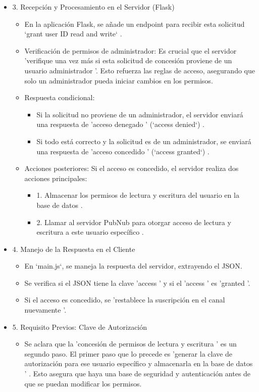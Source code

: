 \documentclass{report}
\begin{document}
\begin{itemize}
    \item 3. Recepción y Procesamiento en el Servidor (Flask)
    \begin{itemize}
        \item En la aplicación Flask, se añade un  endpoint para recibir esta solicitud `grant user ID read and write` .
        \item Verificación de permisos de administrador:  Es crucial que el servidor  'verifique una vez más si esta solicitud de concesión proviene de 
        un usuario administrador '. Esto refuerza las reglas de acceso, asegurando que solo un administrador pueda iniciar cambios en los permisos.
        \item Respuesta condicional: 
        \begin{itemize}
            \item Si la solicitud no proviene de un administrador, el servidor enviará una respuesta de   'acceso denegado ' (`access denied`) .
            \item Si todo está correcto y la solicitud es de un administrador, se enviará una respuesta de   'acceso concedido ' (`access granted`) .
        \end{itemize}
        \item Acciones posteriores:  Si el acceso es concedido, el servidor realiza dos acciones principales:
        \begin{itemize}
            \item 1.   Almacenar los permisos de lectura y escritura del usuario en la base de datos .
            \item 2.   Llamar al servidor PubNub para otorgar acceso de lectura y escritura a este usuario específico .    
        \end{itemize}
    \end{itemize}

    \item 4. Manejo de la Respuesta en el Cliente
    \begin{itemize}
        \item En `main.js`, se maneja la respuesta del servidor, extrayendo el JSON.
        \item Se verifica si el JSON tiene la clave  'access ' y si el  'access ' es  'granted '.
        \item Si el acceso es concedido, se  'restablece la suscripción en el canal nuevamente '.    
    \end{itemize}

    \item 5. Requisito Previos: Clave de Autorización
    \begin{itemize}
        \item Se aclara que la  'concesión de permisos de lectura y escritura ' es un segundo paso. El primer paso que lo precede es 
        'generar la clave de autorización para ese usuario específico y almacenarla en la base de datos ' . Esto asegura que haya una base de 
        seguridad y autenticación antes de que se puedan modificar los permisos.    
    \end{itemize}
\end{itemize}
\end{document}
